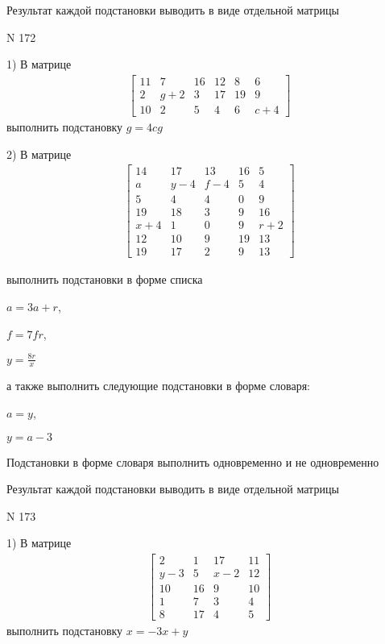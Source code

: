 \documentclass[11pt]{report}
\begin{document}
    Результат каждой подстановки выводить в виде отдельной матрицы

\newpage
N 172


    1) В матрице
\begin{align*}
\left[\begin{matrix}11 & 7 & 16 & 12 & 8 & 6\\2 & g + 2 & 3 & 17 & 19 & 9\\10 & 2 & 5 & 4 & 6 & c + 4\end{matrix}\right]
\end{align*}
выполнить подстановку $g=4 c g$


    2) В матрице
\begin{align*}
\left[\begin{matrix}14 & 17 & 13 & 16 & 5\\a & y - 4 & f - 4 & 5 & 4\\5 & 4 & 4 & 0 & 9\\19 & 18 & 3 & 9 & 16\\x + 4 & 1 & 0 & 9 & r + 2\\12 & 10 & 9 & 19 & 13\\19 & 17 & 2 & 9 & 13\end{matrix}\right]
\end{align*}

выполнить подстановки в форме списка

$a=3 a + r$,

$f=7 f r$,

$y=\frac{8 r}{x}$

а также выполнить следующие подстановки в форме словаря:

$a=y$,

$y=a - 3$


    Подстановки в форме словаря выполнить одновременно и не одновременно


    Результат каждой подстановки выводить в виде отдельной матрицы

\newpage
N 173


    1) В матрице
\begin{align*}
\left[\begin{matrix}2 & 1 & 17 & 11\\y - 3 & 5 & x - 2 & 12\\10 & 16 & 9 & 10\\1 & 7 & 3 & 4\\8 & 17 & 4 & 5\end{matrix}\right]
\end{align*}
выполнить подстановку $x=- 3 x + y$
\end{document}
